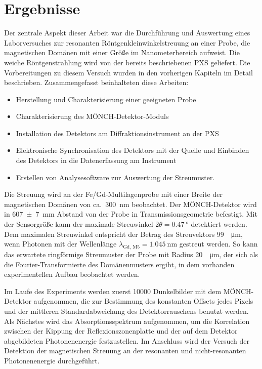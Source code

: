 \chapter{Ergebnisse}
\label{text:auswertung}
Der zentrale Aspekt dieser Arbeit war die Durchführung und Auswertung eines Laborversuches zur resonanten Röntgenkleinwinkelstreuung an einer Probe, die magnetischen Domänen mit einer Größe im Nanometerbereich aufweist. Die weiche Röntgenstrahlung wird von der bereits beschriebenen PXS geliefert. Die Vorbereitungen zu diesem Versuch wurden in den vorherigen Kapiteln im Detail beschrieben. Zusammengefasst beinhalteten diese Arbeiten:
\begin{itemize}
    \item Herstellung und Charakterisierung einer geeigneten Probe
    \item Charakterisierung des MÖNCH-Detektor-Moduls
    \item Installation des Detektors am Diffraktionsinstrument an der PXS
    \item Elektronische Synchronisation des Detektors mit der Quelle und Einbinden des Detektors in die Datenerfassung am Instrument
    \item Erstellen von Analysesoftware zur Auswertung der Streumuster.
\end{itemize}

\noindent
Die Streuung wird an der Fe/Gd-Multilagenprobe mit einer Breite der magnetischen Domänen von ca.\ \SI{300}{\nano\meter} beobachtet. Der MÖNCH-Detektor wird in \SI{607(7)}{\milli\meter} Abstand von der Probe in Transmissionsgeometrie befestigt. Mit der  Sensorgröße kann der maximale Streuwinkel $2\theta = \SI{0.47}{\degree}$ detektiert werden. Dem maximalen Streuwinkel entspricht der Betrag des Streuvektors \SI{99}{\per\micro\meter}, wenn Photonen mit der Wellenlänge $\lambda_\text{Gd, M5} = \SI{1.045}{\nano\meter}$ gestreut werden. So kann das erwartete ringförmige Streumuster der Probe mit Radius \SI{20}{\per\micro\meter}, der sich als die Fourier-Transformierte des Domänenmusters ergibt, in dem vorhanden experimentellen Aufbau beobachtet werden.

\noindent
Im Laufe des Experiments werden zuerst \num{10000} Dunkelbilder mit dem MÖNCH-Detektor aufgenommen, die zur Bestimmung des konstanten Offsets jedes Pixels und der mittleren Standardabweichung des Detektorrauschens benutzt werden. Als Nächstes wird das Absorptionsspektrum aufgenommen, um die Korrelation zwischen der Kippung der Reflexionszonenplatte und der auf dem Detektor abgebildeten Photonenenergie festzustellen. Im Anschluss wird der Versuch der Detektion der magnetischen Streuung an der resonanten und nicht-resonanten Photonenenergie durchgeführt.   

